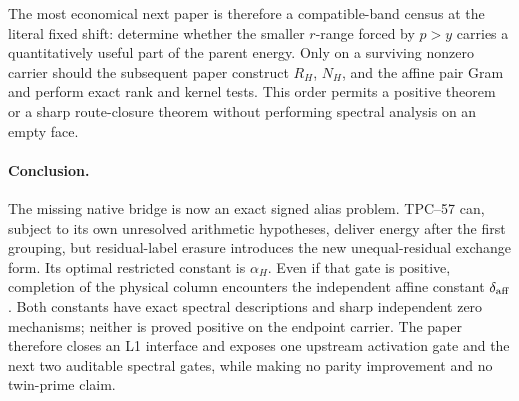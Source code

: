 The most economical next paper is therefore a compatible-band census at the
literal fixed shift: determine whether the smaller \(r\)-range forced by
\(p>y\) carries a quantitatively useful part of the parent energy.  Only on
a surviving nonzero carrier should the subsequent paper construct \(R_H\),
\(N_H\), and the affine pair Gram and perform exact rank and kernel tests.
This order permits a positive theorem or a sharp route-closure theorem
without performing spectral analysis on an empty face.

\paragraph{Conclusion.}
The missing native bridge is now an exact signed alias problem.  TPC--57
can, subject to its own unresolved arithmetic hypotheses, deliver energy
after the first grouping, but residual-label erasure introduces the new
unequal-residual exchange form.  Its optimal restricted constant is
\(\alpha_H\).  Even if that gate is positive, completion of the physical
column encounters the independent affine constant
\(\delta_{\rm aff}\).  Both constants have exact spectral descriptions and
sharp independent zero mechanisms; neither is proved positive on the
endpoint carrier.  The paper therefore closes an L1 interface and exposes
one upstream activation gate and the next two auditable spectral gates,
while making no parity improvement and no twin-prime claim.
